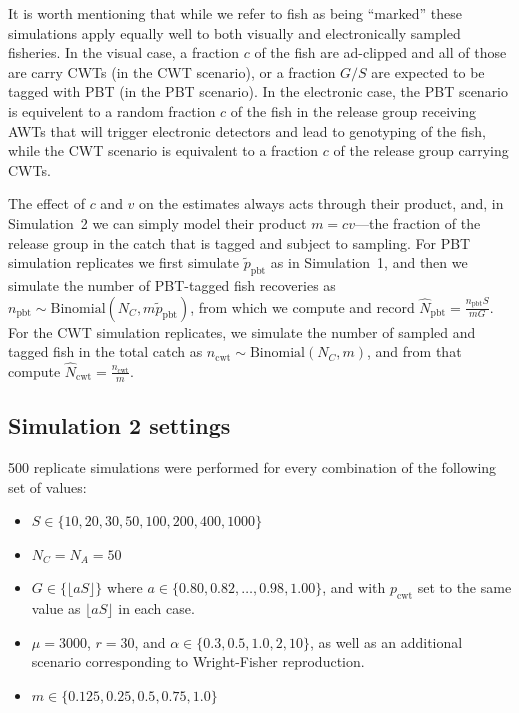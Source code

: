 \documentclass[11pt]{article}
\begin{document}
It is worth mentioning that while we refer to fish as being ``marked'' these simulations apply equally well to both visually
and electronically sampled fisheries.  In the visual case, a fraction $c$ of the fish are ad-clipped and all of those are
carry CWTs (in the CWT scenario), or a fraction $G/S$ are expected to be tagged with PBT (in the PBT scenario).  
In the electronic case, the PBT scenario is 
equivelent to a random fraction $c$ of the fish in the release group receiving AWTs that will trigger electronic detectors
and lead to genotyping of the fish, while the CWT scenario is equivalent to a fraction $c$ of the release group
carrying CWTs.   


The effect of $c$ and $v$ on the estimates always acts through their product, and, in Simulation~2 we can
simply model their product $m = cv$---the fraction of the release group in the catch that is tagged and subject to sampling.
For PBT simulation replicates we first simulate $\tilde{p}_\mathrm{pbt}$ as in Simulation~1, and then we
simulate the number of PBT-tagged fish recoveries as $n_\mathrm{pbt}\sim\mathrm{Binomial}(N_C, m \tilde{p}_\mathrm{pbt})$, from which 
we compute and record $\hat{N}_\mathrm{pbt} = \frac{n_\mathrm{pbt}S}{mG}$.  For the CWT simulation replicates, we simulate the number of sampled
and tagged fish in the total catch as $n_\mathrm{cwt} \sim \mathrm{Binomial}(N_C, m)$, and from that compute
$\hat{N}_\mathrm{cwt} = \frac{n_\mathrm{cwt}}{m}$.
 
 
\subsection{Simulation 2 settings} 

500 replicate simulations were performed for every combination of the following set of values:
\begin{itemize}
\item $S \in \{10, 20, 30, 50, 100, 200, 400, 1000\}$
\item $N_C = N_A = 50$
\item $G \in \{\lfloor a S\rfloor\}$ where $a \in \{0.80, 0.82, \ldots, 0.98, 1.00\}$, and with $p_\mathrm{cwt}$ set to the same
value as $\lfloor a S\rfloor$ in each case.
\item $\mu = 3000$, $r = 30$, and $\alpha \in \{0.3, 0.5, 1.0, 2, 10\}$, as well as an additional scenario corresponding to
Wright-Fisher reproduction. 
\item $m \in \{0.125, 0.25, 0.5, 0.75, 1.0\}$
\end{itemize}
\end{document}

